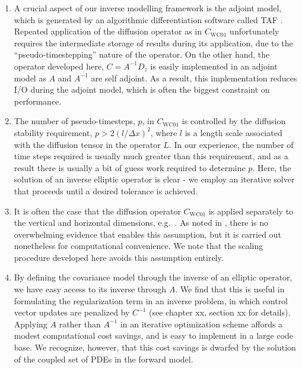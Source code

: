 \begin{enumerate}
    \item A crucial aspect of our inverse modelling framework is the adjoint
        model, which is generated by an algorithmic differentiation software
        called TAF \citep{giering2005}. Repeated application of the diffusion
        operator as in $C_{\text{WC01}}$ unfortunately requires the intermediate
        storage of results during its application, due to the
        ``pseudo-timestepping'' nature of the operator.
        On the other hand, the operator developed here, $C = A^{-1}D_z$ is easily
        implemented in an adjoint model as $A$ and $A^{-1}$ are self adjoint.
        As a result, this implementation reduces I/O during the adjoint model,
        which is often the biggest constraint on performance.
    \item The number of pseudo-timesteps, $p$, in $C_{\text{WC01}}$ is
        controlled by the diffusion stability requirement, $p > 2 (l/\Delta
        x)^2$, where $l$ is a length scale associated with the diffusion tensor
        in the operator $L$. In our experience, the number of time steps
        required is usually much greater than this requirement, and as a result
        there is usually a bit of guess work required
        to determine $p$.
        Here, the solution of an inverse elliptic operator is clear - we
        employ an iterative solver that proceeds until a desired
        tolerance is achieved.
    \item It is often the case that the diffusion operator $C_{\text{WC01}}$ is
        applied separately to the vertical and horizontal dimensions, e.g.\
        \citep{moore_regional_2011-1,forgetECCOv4}.
        As noted in \citet{moore_regional_2011-1}, there is no overwhelming
        evidence that enables this assumption, but it is carried out nonetheless
        for computational convenience.
        We note that the scaling procedure developed here avoids this
        assumption entirely.
    \item By defining the covariance model through the inverse of an elliptic
        operator, we have easy access to its inverse through $A$.
        We find that this is useful in formulating the regularization term in an
        inverse problem, in which control vector updates are penalized by
        $C^{-1}$ (see chapter xx, section
        xx for details).
        Applying $A$ rather than
        $A^{-1}$ in an iterative optimization scheme affords a modest
        computational cost savings, and is easy to implement in a large code
        base. We recognize, however, that this cost savings is dwarfed by the
        solution of the coupled set of PDEs in the forward model.
\end{enumerate}

